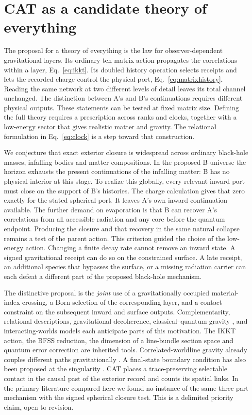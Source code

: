 \section{CAT as a candidate theory of everything}
The proposal for a theory of everything is the law for observer-dependent gravitational layers. Its ordinary ten-matrix action propagates the correlations within a layer, Eq.~\eqref{eq:ikkt}. Its doubled history operation selects receipts and lets the recorded charge control the physical port, Eq.~\eqref{eq:matrixhistory}. Reading the same network at two different levels of detail leaves its total channel unchanged. The distinction between A's and B's continuations requires different physical outputs. These statements can be tested at fixed matrix size. Defining the full theory requires a prescription across ranks and clocks, together with a low-energy sector that gives realistic matter and gravity. The relational formulation in Eq.~\eqref{eq:clock} is a step toward that construction.

We conjecture that exact exterior closure is widespread across ordinary black-hole masses, infalling bodies and matter compositions. In the proposed B-universe the horizon exhausts the present continuations of the infalling matter: B has no physical interior at this stage. To realize this globally, every relevant inward port must close on the support of B's histories. The charge calculation gives that zero exactly for the stated spherical port. It leaves A's own inward continuation available. The further demand on evaporation is that B can recover A's correlations from all accessible radiation and any core before the quantum endpoint. Producing the closure and that recovery in the same natural collapse remains a test of the parent action.
This criterion guided the choice of the low-energy action. Changing a finite decay rate cannot remove an inward state. A signed gravitational receipt can do so on the constrained surface. A late receipt, an additional species that bypasses the surface, or a missing radiation carrier can each defeat a different part of the proposed black-hole mechanism.

The distinctive proposal is the \emph{joint} use of a gravitationally occupied material-index crossing, a Born selection of the corresponding layer, and a contact constraint on the subsequent inward and surface outputs. Complementarity, relational descriptions, gravitational decoherence, classical--quantum gravity \cite{oppenheim,tilloy}, and interacting-worlds models \cite{hall} each anticipate parts of this motivation. The IKKT action, the BFSS reduction, the dimension of a line-bundle section space and quantum error correction are inherited tools. Correlated-worldline gravity already couples different paths gravitationally \cite{cwl}. A final-state boundary condition has also been proposed at the singularity \cite{hm}. CAT places a trace-preserving selectable contact in the causal past of the exterior record and counts its spatial links. In the primary literature compared here we found no instance of the same three-part mechanism with the signed spherical closure test. This is a delimited priority claim, open to revision.

